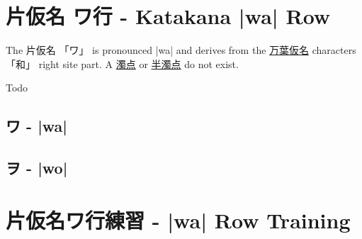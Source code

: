 \section{片仮名  ワ行 - Katakana |wa| Row}


 The 片仮名 {「ワ」} is pronounced  |wa| and  derives from the
\hyperref[sec:Manyogana]{万葉仮名} characters {「和」} right site part.  A
\hyperref[sec:Dakuten]{濁点}  or \hyperref[sec:Handakuten]{半濁点} do not
exist.

\newpage

Todo

\newpage

\subsection{ワ - |wa|} \label{sec:KatakanaWa}


\subsection{ヲ - |wo|} \label{sec:KatakanaWo}


\section{片仮名ワ行練習 -  |wa| Row Training}



\newpage
{}


\newpage
